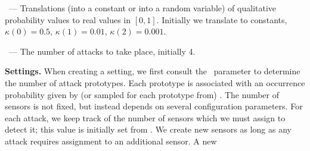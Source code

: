 \begin{compactitem}
\item \kappaTranslations\ --- Translations (into a constant or into a
  random variable) of qualitative probability values to real values in
  $[0,1]$. Initially we translate to constants, $\kappa(0)=0.5$,
  $\kappa(1)=0.01$, $\kappa(2)=0.001$.
  

\item \numAttacks\ --- %
  The number of attacks to take place, %
  initially 4.


\end{compactitem}
%
%
%
%
\textbf{Settings.}
When creating a setting, we first consult
the \numAttacks\ parameter to determine the number of attack prototypes.
Each prototype is associated with an
occurrence probability given by (or sampled for each prototype from)
\attackKappa. The number of sensors is not fixed, but instead depends
on several configuration parameters. For each attack, we keep track of
the number of sensors which we must assign to detect it; this value is
initially set from \sensorToAttackRatio.  We create new sensors as
long as any attack requires assignment to an additional sensor. A new
